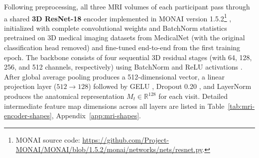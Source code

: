 Following preprocessing, all three MRI volumes of each participant pass through a shared \textbf{3D ResNet-18} encoder implemented in MONAI version 1.5.2\footnote{MONAI source code: \url{https://github.com/Project-MONAI/MONAI/blob/1.5.2/monai/networks/nets/resnet.py}.} \cite{he2016deep,cardoso2022monai}, initialized with complete convolutional weights and BatchNorm statistics pretrained on 3D medical imaging datasets from MedicalNet \cite{chen2019med3d} (with the original classification head removed) and fine-tuned end-to-end from the first training epoch. The backbone consists of four sequential 3D residual stages (with 64, 128, 256, and 512 channels, respectively) using BatchNorm \cite{ioffe2015batchnorm} and ReLU activations \cite{nair2010rectified}. After global average pooling produces a 512-dimensional vector, a linear projection layer ($512\to128$) followed by GELU \cite{hendrycks2016gelu}, Dropout 0.20 \cite{srivastava2014dropout}, and LayerNorm \cite{ba2016layernorm} produces the anatomical representation $M_t\in\mathbb R^{128}$ for each visit. Detailed intermediate feature map dimensions across all layers are listed in Table~\ref{tab:mri-encoder-shapes}, Appendix~\ref{app:mri-shapes}.

